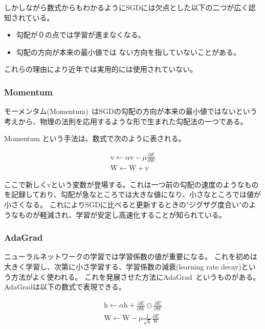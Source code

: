 しかしながら数式からもわかるようにSGDには欠点とした以下の二つが広く認知されている。




\begin{itemize}
  \item 勾配が０の点では学習が進まなくなる。
  \item 勾配の方向が本来の最小値では ない方向を指していないことがある。
\end{itemize}
これらの理由により近年では実用的には使用されていない。

\subsubsection{Momentum}

モーメンタム(Momentum)~\cite{momentum}はSGDの勾配の方向が本来の最小値ではないという考えから、物理の法則を応用するような形で生まれた勾配法の一つである。


Momentum という手法は、数式で次のように表される。

\begin{eqnarray}
    \mathrm{v} \leftarrow \alpha \mathrm{v} - \mu \frac {\partial E }{\partial \mathrm{W}} \\
    \mathrm{W} \leftarrow \mathrm{W+v}
\label{eq:norm uneq}
\end{eqnarray}

ここで新しく$ \mathrm{v} $という変数が登場する。これは一つ前の勾配の速度のようなものを記録しており、勾配が急なところでは大きな値になり、小さなところでは値が小さくなる。
これによりSGDに比べると更新するときの"ジグザグ度合い"のようなものが軽減され、学習が安定し高速化することが知られている。


\subsubsection{AdaGrad}

ニューラルネットワークの学習では学習係数の値が重要になる。
これを初めは大きく学習し、次第に小さ学習する、学習係数の減衰(learning rate decay)という方法がよく使われる。
これを発展させた方法にAdaGrad~\cite{momentum}というものがある。
AdaGradは以下の数式で表現できる。

\begin{eqnarray}　
    \mathrm{h} \leftarrow \alpha \mathrm{h} + \frac {\partial E }{\partial \mathrm{W}} \odot \frac {\partial E }{\partial \mathrm{W}}  \\
    \mathrm{W} \leftarrow \mathrm{W}  - \mu \frac{ 1 }{\sqrt{\mathrm{h}}} \frac{ \partial E }{\mathrm{W}} 
\label{eq:norm uneq}
\end{eqnarray}

